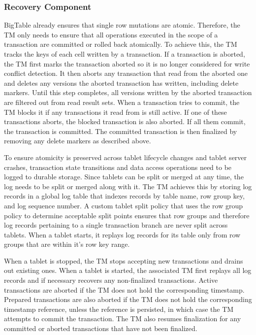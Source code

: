 \documentclass[10pt,final,journal]{IEEEtran}
\begin{document}
\subsubsection{Recovery Component}
BigTable already ensures that single row mutations are atomic. Therefore, the TM only needs to ensure that all operations executed in the scope of a transaction are committed or rolled back atomically. To achieve this, the TM tracks the keys of each cell written by a transaction. If a transaction is aborted, the TM first marks the transaction aborted so it is no longer considered for write conflict detection. It then aborts any transaction that read from the aborted one and deletes any versions the aborted transaction has written, including delete markers. Until this step completes, all versions written by the aborted transaction are filtered out from read result sets. When a transaction tries to commit, the TM blocks it if any transactions it read from is still active. If one of these transactions aborts, the blocked transaction is also aborted. If all them commit, the transaction is committed. The committed transaction is then finalized by removing any delete markers as described above.

To ensure atomicity is preserved across tablet lifecycle changes and tablet server crashes, transaction state transitions and data access operations need to be logged to durable storage. Since tablets can be split or merged at any time, the log needs to be split or merged along with it. The TM achieves this by storing log records in a global log table that indexes records by table name, row group key, and log sequence number. A custom tablet split policy that uses the row group policy to determine acceptable split points ensures that row groups and therefore log records pertaining to a single transaction branch are never split across tablets. When a tablet starts, it replays log records for its table only from row groups that are within it's row key range.

When a tablet is stopped, the TM stops accepting new transactions and drains out existing ones. When a tablet is started, the associated TM first replays all log records and if necessary recovers any non-finalized transactions. Active transactions are aborted if the TM does not hold the corresponding timestamp. Prepared transactions are also aborted if the TM does not hold the corresponding timestamp reference, unless the reference is persisted, in which case the TM attempts to commit the transaction. The TM also resumes finalization for any committed or aborted transactions that have not been finalized.
\end{document}
